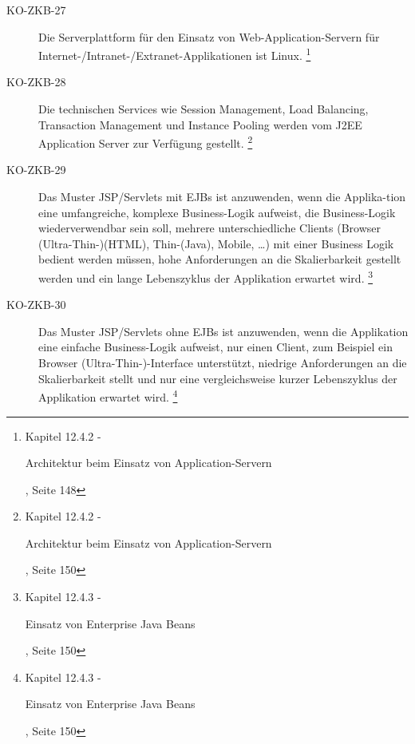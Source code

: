 \documentclass[
11pt, %
a4paper, %
BCOR25mm, %
DIV14, %
footsepline = false, %
headsepline, %
twoside, %
openright,
abstracton, %
listof=totocnumbered, %
bibliography=totocnumbered %
]{scrreprt}
\begin{document}
\begin{description}
    \item[KO-ZKB-27] Die Serverplattform für den Einsatz von
    Web-Application-Servern für Internet-/Intranet-/Extranet-Applikationen ist Linux.
    \footnote{\cite{ZkbHandbuchDerItArchitektur} Kapitel 12.4.2 -
    \begin{itshape}Architektur beim Einsatz von
    Application-Servern\end{itshape}, Seite 148}
    
    \item[KO-ZKB-28] Die technischen Services wie Session Management, Load
    Balancing, Transaction Management und Instance Pooling werden vom J2EE Application
    Server zur Verfügung gestellt.
    \footnote{\cite{ZkbHandbuchDerItArchitektur} Kapitel 12.4.2 -
    \begin{itshape}Architektur beim Einsatz von
    Application-Servern\end{itshape}, Seite 150}
    
    \item[KO-ZKB-29] Das Muster JSP/Servlets mit EJBs ist anzuwenden, wenn die
    Applika-tion eine umfangreiche, komplexe Business-Logik aufweist, die
    Business-Logik wiederverwendbar sein soll, mehrere unterschiedliche Clients
    (Browser (Ultra-Thin-)(HTML), Thin-(Java), Mobile, …) mit einer Business
    Logik bedient werden müssen, hohe Anforderungen an die Skalierbarkeit
    gestellt werden und ein lange Lebenszyklus der Applikation erwartet wird.
    \footnote{\cite{ZkbHandbuchDerItArchitektur} Kapitel 12.4.3 -
    \begin{itshape}Einsatz von Enterprise Java Beans\end{itshape}, Seite 150}
    
    \item[KO-ZKB-30] Das Muster JSP/Servlets ohne EJBs ist anzuwenden, wenn die
    Applikation eine einfache Business-Logik aufweist, nur einen Client, zum
    Beispiel ein Browser (Ultra-Thin-)-Interface unterstützt, niedrige
    Anforderungen an die Skalierbarkeit stellt und nur eine vergleichsweise
    kurzer Lebenszyklus der Applikation erwartet wird.
    \footnote{\cite{ZkbHandbuchDerItArchitektur} Kapitel 12.4.3 -
    \begin{itshape}Einsatz von Enterprise Java Beans\end{itshape}, Seite 150}
    

\end{description}
\end{document}
